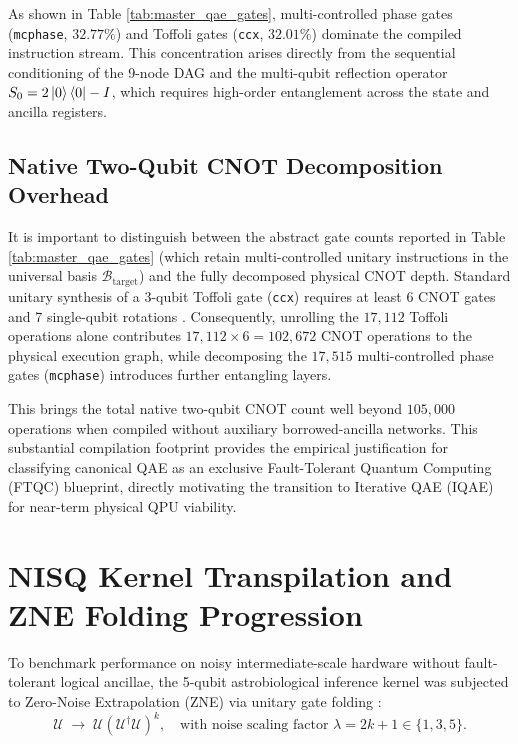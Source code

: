 As shown in Table \ref{tab:master_qae_gates}, multi-controlled phase gates (\texttt{mcphase}, $32.77\%$) and Toffoli gates (\texttt{ccx}, $32.01\%$) dominate the compiled instruction stream. This concentration arises directly from the sequential conditioning of the 9-node DAG and the multi-qubit reflection operator $S_0 = 2\left|0\right\rangle\left\langle0\right| - I$, which requires high-order entanglement across the state and ancilla registers.

\subsection{Native Two-Qubit CNOT Decomposition Overhead}\label{subsec:app_cnot_decomposition_overhead}
It is important to distinguish between the abstract gate counts reported in Table \ref{tab:master_qae_gates} (which retain multi-controlled unitary instructions in the universal basis $\mathcal{B}_{\mathrm{target}}$) and the fully decomposed physical CNOT depth. Standard unitary synthesis of a 3-qubit Toffoli gate (\texttt{ccx}) requires at least 6 CNOT gates and 7 single-qubit rotations \cite{barenco1995}. Consequently, unrolling the $17{,}112$ Toffoli operations alone contributes $17{,}112 \times 6 = 102{,}672$ CNOT operations to the physical execution graph, while decomposing the $17{,}515$ multi-controlled phase gates (\texttt{mcphase}) introduces further entangling layers. 

This brings the total native two-qubit CNOT count well beyond $105{,}000$ operations when compiled without auxiliary borrowed-ancilla networks. This substantial compilation footprint provides the empirical justification for classifying canonical QAE as an exclusive Fault-Tolerant Quantum Computing (FTQC) blueprint, directly motivating the transition to Iterative QAE (IQAE) for near-term physical QPU viability.

\section{NISQ Kernel Transpilation and ZNE Folding Progression}\label{sec:app_nisq_kernel_profile}

To benchmark performance on noisy intermediate-scale hardware without fault-tolerant logical ancillae, the 5-qubit astrobiological inference kernel was subjected to Zero-Noise Extrapolation (ZNE) via unitary gate folding \cite{temme2017, li2017, endo2018}:
\begin{equation}
\mathcal{U} \;\longrightarrow\; \mathcal{U} \left(\mathcal{U}^\dagger \mathcal{U}\right)^k, \quad \text{with noise scaling factor } \lambda = 2k + 1 \in \{1, 3, 5\}.
\end{equation}

